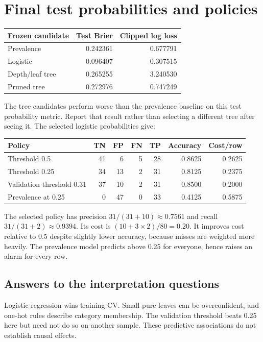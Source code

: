 \section{Final test probabilities and policies}
\begin{center}
\begin{tabular}{lrr}\toprule
Frozen candidate&Test Brier&Clipped log loss\\\midrule
Prevalence&0.242361&0.677791\\
Logistic&0.096407&0.307515\\
Depth/leaf tree&0.265255&3.240530\\
Pruned tree&0.272976&0.747249\\\bottomrule
\end{tabular}
\end{center}
The tree candidates perform worse than the prevalence baseline on this test probability metric. Report that result rather than selecting a different tree after seeing it.
The selected logistic probabilities give:
\begin{center}
\begin{tabular}{lrrrrrr}\toprule
Policy&TN&FP&FN&TP&Accuracy&Cost/row\\\midrule
Threshold 0.5&41&6&5&28&0.8625&0.2625\\
Threshold 0.25&34&13&2&31&0.8125&0.2375\\
Validation threshold 0.31&37&10&2&31&0.8500&0.2000\\
Prevalence at 0.25&0&47&0&33&0.4125&0.5875\\\bottomrule
\end{tabular}
\end{center}
The selected policy has precision $31/(31+10)\approx0.7561$ and recall $31/(31+2)\approx0.9394$. Its cost is $(10+3\times2)/80=0.20$. It improves cost relative to 0.5 despite slightly lower accuracy, because misses are weighted more heavily. The prevalence model predicts above 0.25 for everyone, hence raises an alarm for every row.

\subsection*{Answers to the interpretation questions}
Logistic regression wins training CV. Small pure leaves can be overconfident, and one-hot rules describe category membership. The validation threshold beats 0.25 here but need not do so on another sample. These predictive associations do not establish causal effects.


